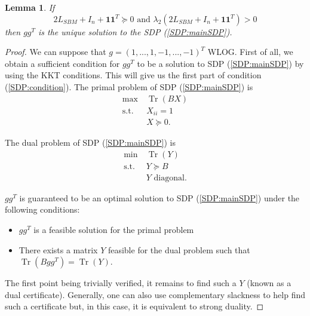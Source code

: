 \documentclass[english]{article}
\newtheorem{lemma}{Lemma}
\newcommand{\1}{\textbf{1}}
\newcommand{\tr}{\operatorname{Tr}}
\begin{document}
\begin{lemma} \label{lemma:lemma1SDP}
If
\begin{equation}
2L_{SBM} +I_n + \1\1^T \succeq 0 \text{ and } \lambda_2\left(2L_{SBM} +I_n + \1\1^T\right)>0 \label{SDP:condition}
\end{equation} 
then $gg^T$ is the unique solution to the SDP (\ref{SDP:mainSDP}).
\end{lemma}
\begin{proof}
We can suppose that $g=(1,...,1,-1,...,-1)^T$ WLOG.
First of all, we obtain a sufficient condition for $gg^T$ to be a solution to SDP (\ref{SDP:mainSDP}) by using the KKT conditions. This will give us the first part of condition (\ref{SDP:condition}).
The primal problem of SDP (\ref{SDP:mainSDP}) is
\begin{align}
\max\ & \tr (BX)\nonumber\\
\text{s.t.}\ &X_{ii}=1 \nonumber \\
& X\succeq 0.\nonumber
\end{align}

The dual problem of SDP (\ref{SDP:mainSDP}) is
\begin{align}
\min\ & \tr (Y)\nonumber\\
\text{s.t.}\ &Y \succeq B \label{SDP:dual1}\\
& Y \text{ diagonal}. \nonumber
\end{align}

$gg^T$ is guaranteed to be an optimal solution to SDP (\ref{SDP:mainSDP}) under the following conditions:
\begin{itemize}
\item $gg^T$ is a feasible solution for the primal problem
\item There exists a matrix $Y$ feasible for the dual problem such that $\tr(Bgg^T)= \tr(Y)$.
\end{itemize}
The first point being trivially verified, it remains to find such a $Y$ (known as a dual certificate). Generally, one can also use complementary slackness to help find such a certificate but, in this case, it is equivalent to strong duality.


\end{proof}
\end{document}
